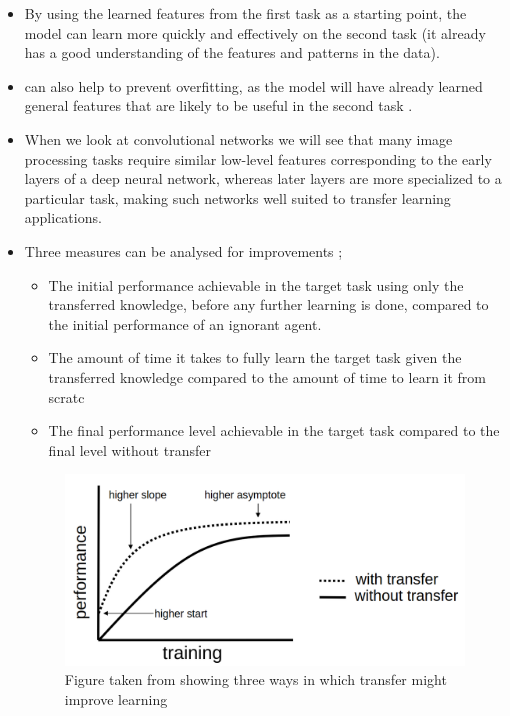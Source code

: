 \documentclass[11pt]{article}
\begin{document}
\begin{itemize}
    \item By using the learned features from the first task as a starting point, the model can learn more quickly and effectively on the second task \cite{geeks-transfer-learning} (it already has a good understanding of the features and patterns in the data).
    \item can also help to prevent overfitting, as the model will have already learned general features that are likely to be useful in the second task \cite{geeks-transfer-learning}.
    \item When we look at convolutional networks we will see that many image processing tasks require similar low-level features corresponding to the early layers of a deep neural network, whereas later layers are more specialized to a particular task, making such networks well suited to transfer learning applications. \cite{deep-learning-book}
    \item Three measures can be analysed for improvements \cite{torrey-handbook};
    
    \begin{itemize}
        \item The initial performance achievable in the target task using only the transferred knowledge, before any further learning is done, compared to the initial performance of an ignorant agent.
        \item The amount of time it takes to fully learn the target task given the transferred knowledge compared to the amount of time to learn it from scratc
        \item The final performance level achievable in the target task compared to the final level
        without transfer
    \end{itemize}

    \begin{figure}[H]
        \centering
        \includegraphics[width=0.7\linewidth]{images/performance.png}
        \caption{Figure taken from \cite{torrey-handbook} showing three ways in which transfer might improve learning}
        \label{fig:performance}
    \end{figure}
    
    
\end{itemize}
\end{document}
